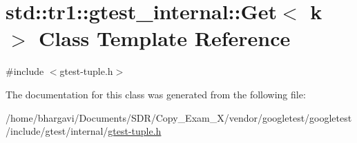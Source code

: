 \hypertarget{classstd_1_1tr1_1_1gtest__internal_1_1_get}{}\section{std\+:\+:tr1\+:\+:gtest\+\_\+internal\+:\+:Get$<$ k $>$ Class Template Reference}
\label{classstd_1_1tr1_1_1gtest__internal_1_1_get}


{\ttfamily \#include $<$gtest-\/tuple.\+h$>$}



The documentation for this class was generated from the following file\+:\begin{DoxyCompactItemize}
\item 
/home/bhargavi/\+Documents/\+S\+D\+R/\+Copy\+\_\+\+Exam\+\_\+X/vendor/googletest/googletest/include/gtest/internal/\hyperlink{gtest-tuple_8h}{gtest-\/tuple.\+h}\end{DoxyCompactItemize}
